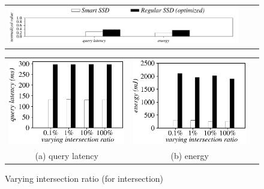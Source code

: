 \begin{figure}[tbp]
\centering
\begin{tabular}{ccc}
\includegraphics[width=0.52\columnwidth]{figures/banner2.pdf}
\end{tabular}
\vspace{-0.1cm}
\renewcommand{\tabcolsep}{0.1mm}
\begin{tabular}{ccc}
\includegraphics[width=0.5\columnwidth]{figures/Intersection-time-VaryInterRatio.eps}&
\includegraphics[width=0.5\columnwidth]{figures/Intersection-energy-VaryInterRatio.eps}\\
(a) query latency & (b) energy
\end{tabular}
\caption{Varying intersection ratio (for intersection)}
\label{fig:varyInterRatioIntersection1}
\end{figure}




